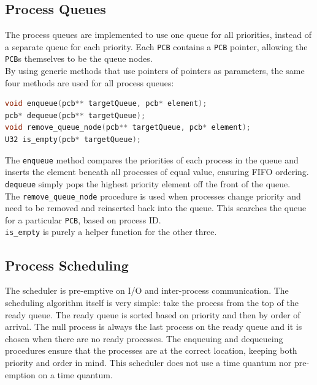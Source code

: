 \documentclass[12pt]{report}
\begin{document}
\subsection{Process Queues}

The process queues are implemented to use one queue for all priorities, instead of a separate queue for each priority. Each {\tt PCB} contains a {\tt PCB} pointer, allowing the {\tt PCB}s themselves to be the queue nodes. \\
By using generic methods that use pointers of pointers as parameters, the same four methods are used for all process queues: \\
\begin{minipage}{\textwidth}
\begin{lstlisting}[language=C, frame=single]
void enqueue(pcb** targetQueue, pcb* element);
pcb* dequeue(pcb** targetQueue);
void remove_queue_node(pcb** targetQueue, pcb* element);
U32 is_empty(pcb* targetQueue);
\end{lstlisting}
\end{minipage}
The {\tt enqueue} method compares the priorities of each process in the queue and inserts the element beneath all processes of equal value, ensuring FIFO ordering.\\
{\tt dequeue} simply pops the highest priority element off the front of the queue.\\
The {\tt remove_queue_node} procedure is used when processes change priority and need to be removed and reinserted back into the queue. This searches the queue for a particular {\tt PCB}, based on process ID.\\
{\tt is_empty} is purely a helper function for the other three.\\

\subsection{Process Scheduling}

The scheduler is pre-emptive on I/O and inter-process communication.
The scheduling algorithm itself is very simple: take the process from the top of the ready queue. The ready queue is sorted based on priority and then by order of arrival. The null process is always the last process on the ready queue and it is chosen when there are no ready processes. The enqueuing and dequeueing procedures ensure that the processes are at the correct location, keeping both priority and order in mind. This scheduler does not use a time quantum nor pre-emption on a time quantum.\\
\end{document}
